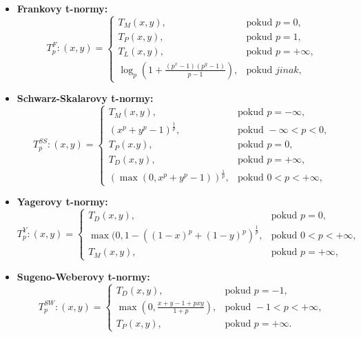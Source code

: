 \begin{itemize}
    \item \textbf{Frankovy t-normy:}
    $$T_p^F:(x,y)=\begin{cases} T_M(x,y), & \mbox{pokud }  p = 0,\\ 
                                T_P(x,y), & \mbox{pokud } p = 1,\\
                                T_L(x,y), & \mbox{pokud } p = +\infty,\\
                                \log_p(1+\frac{(p^x-1)(p^y-1)}{p-1}), & \mbox{pokud } jinak, 
                                \end{cases}$$
    \item \textbf{Schwarz-Skalarovy t-normy:}
    $$T_p^{SS}:(x,y)=\begin{cases} T_M(x,y), & \mbox{pokud }  p = -\infty,\\ 
                                (x^p+y^p-1)^\frac{1}{p}, & \mbox{pokud }  -\infty < p < 0,\\ 
                                T_P(x.y), & \mbox{pokud } p = 0,\\
                                T_D(x,y), & \mbox{pokud } p = +\infty,\\
                                (\max(0, x^p+y^p-1))^\frac{1}{p}, & \mbox{pokud } 0 < p < +\infty, \end{cases}$$
    \item \textbf{Yagerovy t-normy:}
    $$T_p^Y:(x,y)=\begin{cases}  T_D(x,y), & \mbox{pokud } p = 0,\\
                                \max(0,1-((1-x)^p+(1-y)^p)^\frac{1}{p} , & \mbox{pokud } 0 < p < +\infty,\\
                                T_M(x,y), & \mbox{pokud } p = +\infty,
                                \end{cases}$$
    \item \textbf{Sugeno-Weberovy t-normy:}
    $$T_p^{SW}:(x,y)=\begin{cases}  T_D(x,y), & \mbox{pokud } p = -1,\\
                                    \max(0,\frac{x+y-1+pxy}{1+p}) , & \mbox{pokud } -1 < p < +\infty,\\
                                    T_P(x,y), & \mbox{pokud } p = +\infty.
                                    \end{cases}$$
\end{itemize}

